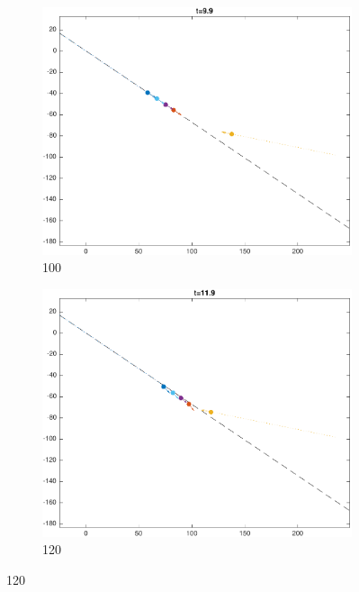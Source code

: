 \begin{figure} \label{fig:in}
    \centering
    \begin{subfigure}{0.23\textwidth} \label{subfig:in_100}
        \includegraphics[width=\textwidth]{fig/in_100}
        \caption{100}
    \end{subfigure}
    \begin{subfigure}{0.23\textwidth} \label{subfig:in_120}
        \includegraphics[width=\textwidth]{fig/in_120}
        \caption{120}
    \end{subfigure}


\end{figure}
